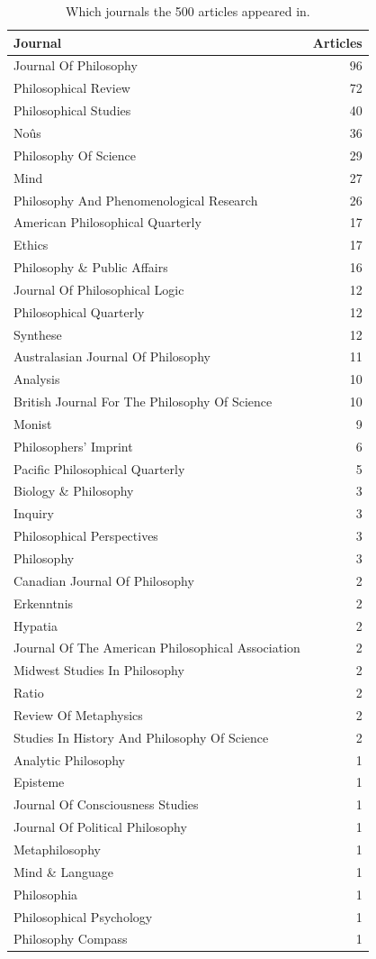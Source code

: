 \documentclass[
  10pt,
  letterpaper,
  DIV=11,
  numbers=noendperiod,
  twoside]{scrartcl}
\begin{document}
\begin{longtable}[]{@{}lr@{}}

\caption{\label{tbl-journals-in-main-bib}Which journals the 500 articles
appeared in.}

\tabularnewline

\toprule\noalign{}
Journal & Articles \\
\midrule\noalign{}
\endhead
\bottomrule\noalign{}
\endlastfoot
Journal Of Philosophy & 96 \\
Philosophical Review & 72 \\
Philosophical Studies & 40 \\
Noûs & 36 \\
Philosophy Of Science & 29 \\
Mind & 27 \\
Philosophy And Phenomenological Research & 26 \\
American Philosophical Quarterly & 17 \\
Ethics & 17 \\
Philosophy \& Public Affairs & 16 \\
Journal Of Philosophical Logic & 12 \\
Philosophical Quarterly & 12 \\
Synthese & 12 \\
Australasian Journal Of Philosophy & 11 \\
Analysis & 10 \\
British Journal For The Philosophy Of Science & 10 \\
Monist & 9 \\
Philosophers' Imprint & 6 \\
Pacific Philosophical Quarterly & 5 \\
Biology \& Philosophy & 3 \\
Inquiry & 3 \\
Philosophical Perspectives & 3 \\
Philosophy & 3 \\
Canadian Journal Of Philosophy & 2 \\
Erkenntnis & 2 \\
Hypatia & 2 \\
Journal Of The American Philosophical Association & 2 \\
Midwest Studies In Philosophy & 2 \\
Ratio & 2 \\
Review Of Metaphysics & 2 \\
Studies In History And Philosophy Of Science & 2 \\
Analytic Philosophy & 1 \\
Episteme & 1 \\
Journal Of Consciousness Studies & 1 \\
Journal Of Political Philosophy & 1 \\
Metaphilosophy & 1 \\
Mind \& Language & 1 \\
Philosophia & 1 \\
Philosophical Psychology & 1 \\
Philosophy Compass & 1 \\

\end{longtable}
\end{document}
